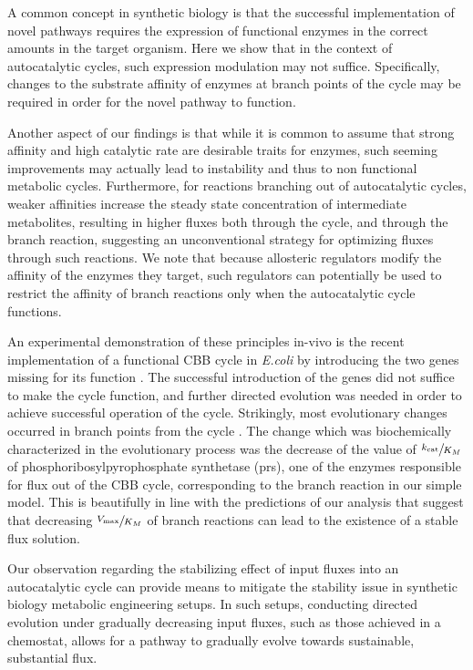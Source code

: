A common concept in synthetic biology is that the successful implementation of novel pathways requires the expression of functional enzymes in the correct amounts in the target organism.
Here we show that in the context of autocatalytic cycles, such expression modulation may not suffice.
Specifically, changes to the substrate affinity of enzymes at branch points of the cycle may be required in order for the novel pathway to function.

Another aspect of our findings is that while it is common to assume that strong affinity and high catalytic rate are desirable traits for enzymes, such seeming improvements may actually lead to instability and thus to non functional metabolic cycles.
Furthermore, for reactions branching out of autocatalytic cycles, weaker affinities increase the steady state concentration of intermediate metabolites, resulting in higher fluxes both through the cycle, and through the branch reaction, suggesting an unconventional strategy for optimizing fluxes through such reactions.
We note that because allosteric regulators modify the affinity of the enzymes they target, such regulators can potentially be used to restrict the affinity of branch reactions only when the autocatalytic cycle functions.

An experimental demonstration of these principles in-vivo is the recent implementation of a functional CBB cycle in \emph{E.coli} by introducing the two genes missing for its function \cite{Antonovsky2016-jy}.
The successful introduction of the genes did not suffice to make the cycle function, and further directed evolution was needed in order to achieve successful operation of the cycle.
Strikingly, most evolutionary changes occurred in branch points from the cycle \cite{Antonovsky2016-jy}.
The change which was biochemically characterized in the evolutionary process was the decrease of the value of $\sfrac{k_{\text{cat}}}{K_M}$ of phosphoribosylpyrophosphate synthetase (prs), one of the enzymes responsible for flux out of the CBB cycle, corresponding to the branch reaction in our simple model.
This is beautifully in line with the predictions of our analysis that suggest that decreasing $\sfrac{V_{\max}}{K_M}$ of branch reactions can lead to the existence of a stable flux solution.

Our observation regarding the stabilizing effect of input fluxes into an autocatalytic cycle can provide means to mitigate the stability issue in synthetic biology metabolic engineering setups.
In such setups, conducting directed evolution under gradually decreasing input fluxes, such as those achieved in a chemostat, allows for a pathway to gradually evolve towards sustainable, substantial flux.

